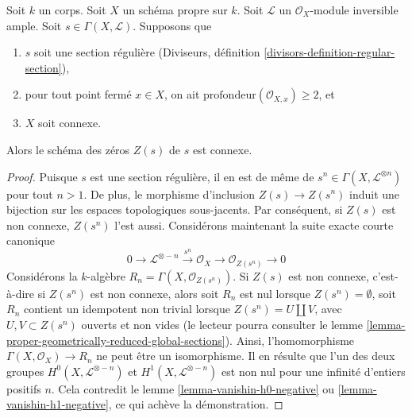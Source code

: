 \begin{lemma}
\label{lemma-connectedness-ample-divisor}
Soit $k$ un corps. Soit $X$ un schéma propre sur $k$. Soit $\mathcal{L}$
un $\mathcal{O}_X$-module inversible ample. Soit
$s \in \Gamma(X, \mathcal{L})$. Supposons que
\begin{enumerate}
\item $s$ soit une section régulière
(Diviseurs, définition \ref{divisors-definition-regular-section}),
\item pour tout point fermé $x \in X$, on ait
$\text{profondeur}(\mathcal{O}_{X, x}) \geq 2$, et
\item $X$ soit connexe.
\end{enumerate}
Alors le schéma des zéros $Z(s)$ de $s$ est connexe.
\end{lemma}

\begin{proof}
Puisque $s$ est une section régulière, il en est de même de
$s^n \in \Gamma(X, \mathcal{L}^{\otimes n})$ pour tout $n > 1$.
De plus, le morphisme d'inclusion $Z(s) \to Z(s^n)$ induit une bijection
sur les espaces topologiques sous-jacents. Par conséquent, si $Z(s)$ est non connexe,
$Z(s^n)$ l'est aussi. Considérons maintenant la suite exacte courte canonique
$$
0 \to \mathcal{L}^{\otimes -n} \xrightarrow{s^n}
\mathcal{O}_X \to \mathcal{O}_{Z(s^n)} \to 0
$$
Considérons la $k$-algèbre $R_n = \Gamma(X, \mathcal{O}_{Z(s^n)})$.
Si $Z(s)$ est non connexe, c'est-à-dire si $Z(s^n)$ est non connexe,
alors soit $R_n$ est nul lorsque $Z(s^n) = \emptyset$, soit
$R_n$ contient un idempotent non trivial lorsque $Z(s^n) = U \amalg V$, avec
$U, V \subset Z(s^n)$ ouverts et non vides (le lecteur pourra consulter le
lemme \ref{lemma-proper-geometrically-reduced-global-sections}).
Ainsi, l'homomorphisme $\Gamma(X, \mathcal{O}_X) \to R_n$ ne peut être un isomorphisme.
Il en résulte que l'un des deux groupes $H^0(X, \mathcal{L}^{\otimes -n})$ et
$H^1(X, \mathcal{L}^{\otimes -n})$ est non nul pour une infinité
d'entiers positifs $n$. Cela contredit le lemme \ref{lemma-vanishin-h0-negative} ou
\ref{lemma-vanishin-h1-negative},
ce qui achève la démonstration.
\end{proof}














